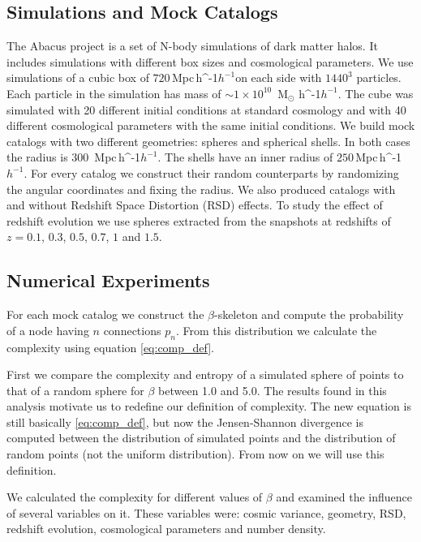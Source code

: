 \documentclass[fleqn,usenatbib]{mnras}
\newcommand{\Msunh}{\,{\rm M}$_{\odot}$\,\,\ifmmode h^{-1}\else $h^{-1}$\fi}
\newcommand{\Mpch}{\,{\rm Mpc}\,\ifmmode h^{-1}\else $h^{-1}$\fi}
\begin{document}
\subsection{Simulations and Mock Catalogs}
The Abacus project \citep{abacus} is a set of N-body simulations of
dark matter halos. It includes simulations with different box sizes
and cosmological parameters. We use simulations of a cubic box of
$720$\Mpch on each side with $1440^3$ particles. Each particle in the
simulation has mass of $\sim1\times10^{10}$ \Msunh. The cube was
simulated with 20 different initial conditions at standard cosmology
and with 40 different cosmological parameters with the same initial
conditions. 
We build mock catalogs with two different geometries: spheres and
spherical shells. In both cases the radius is $300$ \Mpch. The shells
have an inner radius of $250$\Mpch. For every catalog we construct
their random counterparts by randomizing the angular coordinates and
fixing the radius. We also produced catalogs with and without Redshift
Space Distortion (RSD) effects. To study the effect of redshift
evolution we use spheres extracted from the snapshots at redshifts of
$z=0.1$, $0.3$, $0.5$, $0.7$, $1$ and $1.5$. 




\subsection{Numerical Experiments}

For each mock catalog we construct the $\beta$-skeleton and compute
the probability of a node having $n$ connections $p_n$. From this
distribution we calculate the complexity using equation
\ref{eq:comp_def}.  

First we compare the complexity and entropy of a simulated sphere of
points to that of a random sphere for $\beta$ between 1.0 and 5.0. The
results found in this analysis motivate us to redefine our definition
of complexity. The new equation is still basically \ref{eq:comp_def},
but now the Jensen-Shannon divergence is computed between the
distribution of simulated points and the distribution of random points
(not the uniform distribution). From now on we will use this
definition. 

We calculated the complexity for different values of $\beta$ and
examined the influence of several variables on it. These variables
were: cosmic variance, geometry, RSD, redshift evolution, cosmological
parameters and number density. 
\end{document}
